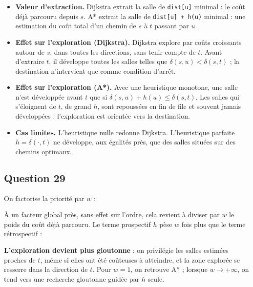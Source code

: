 \documentclass[11pt,a4paper]{article}
\providecommand{\tightlist}{\setlength{\itemsep}{0pt}\setlength{\parskip}{0pt}}
\newcommand{\equationajustee}[1]{%
  \sbox{\boiteequation}{$\displaystyle #1$}%
  \ifdim\wd\boiteequation>\linewidth
    \[\resizebox{\linewidth}{!}{\usebox{\boiteequation}}\]%
  \else
    \[#1\]%
  \fi}
\begin{document}
\begin{itemize}
\tightlist
\item
  \textbf{Valeur d'extraction.} Dijkstra extrait la salle de \texttt{dist{[}u{]}} minimal : le coût déjà parcouru depuis \(s\). A* extrait la salle de \texttt{dist{[}u{]}\ +\ h(u)} minimal : une estimation du coût total d'un chemin de \(s\) à \(t\) passant par \(u\).
\item
  \textbf{Effet sur l'exploration (Dijkstra).} Dijkstra explore par coûts croissants autour de \(s\), dans toutes les directions, sans tenir compte de \(t\). Avant d'extraire \(t\), il développe toutes les salles telles que \(\delta(s,u) < \delta(s,t)\) ; la destination n'intervient que comme condition d'arrêt.
\item
  \textbf{Effet sur l'exploration (A*).} Avec une heuristique monotone, une salle n'est développée avant \(t\) que si \(\delta(s,u) + h(u) \le \delta(s,t)\). Les salles qui s'éloignent de \(t\), de grand \(h\), sont repoussées en fin de file et souvent jamais développées : l'exploration est orientée vers la destination.
\item
  \textbf{Cas limites.} L'heuristique nulle redonne Dijkstra. L'heuristique parfaite \(h = \delta(\cdot,t)\) ne développe, aux égalités près, que des salles situées sur des chemins optimaux.
\end{itemize}

\hypertarget{question-29}{%
\subsection{Question 29}\label{question-29}}

On factorise la priorité par \(w\) :

\equationajustee{f(u) = w\left(\tfrac{1}{w}\,\texttt{dist}[u] + h(u)\right).}

À un facteur global près, sans effet sur l'ordre, cela revient à diviser par \(w\) le poids du coût déjà parcouru. Le terme prospectif \(h\) pèse \(w\) fois plus que le terme rétrospectif :

\equationajustee{f(u) < f(v) \iff \texttt{dist}[u] - \texttt{dist}[v] < w\,\bigl(h(v) - h(u)\bigr).}

\textbf{L'exploration devient plus gloutonne} : on privilégie les salles estimées proches de \(t\), même si elles ont été coûteuses à atteindre, et la zone explorée se resserre dans la direction de \(t\). Pour \(w = 1\), on retrouve A* ; lorsque \(w \to +\infty\), on tend vers une recherche gloutonne guidée par \(h\) seule.
\end{document}

